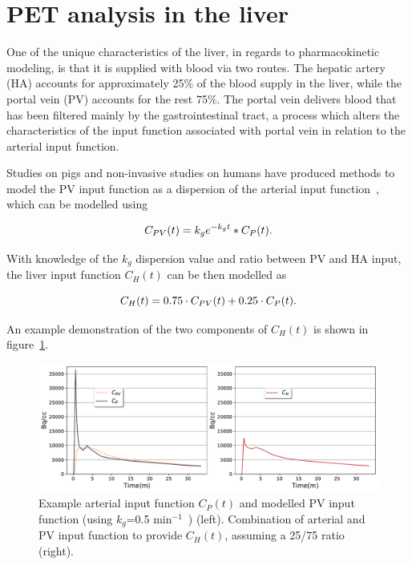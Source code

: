 \section{PET analysis in the liver}
One of the unique characteristics of the liver, in regards to pharmacokinetic modeling, is that it is supplied with blood via two routes. The hepatic artery (HA) accounts for approximately 25\% of the blood supply in the liver, while the portal vein (PV) accounts for the rest 75\%. The portal vein delivers blood that has been filtered mainly by the gastrointestinal tract, a process which alters the characteristics of the input function associated with portal vein in relation to the arterial input function. 

Studies on pigs and non-invasive studies on humans have produced methods to model the PV input function as a dispersion of the arterial input function~\cite{Kudomi2008,Winterdahl2011}, which can be modelled using 

\begin{equation} 
{C_{PV}}(t)  = {k_g} e^{-k_g t} \ast C_P(t)   \\ . \\
\label{eqn:PortalVein}
\end{equation}

With knowledge of the $k_g$ dispersion value and ratio between PV and HA input, the liver input function ${C_{H}}(t)$ can be then modelled as

\begin{equation} 
{C_{H}}(t)  = 0.75 \cdot C_{PV}(t) + 0.25 \cdot C_{P}(t)  \\ . \\
\label{eqn:HepaticInput}
\end{equation}

An example demonstration of the two components of ${C_{H}}(t)$ is shown in figure~\ref{fig_2_2:LiverDualInputFunction}.

\begin{figure} [h!]
\centering
\includegraphics[scale=0.53,angle=0]{2_Theory_Methods/figures/2_2_LiverDualInputFunction.pdf}
\caption{Example arterial input function $C_{P}(t)$ and modelled PV input function (using $k_g$=0.5 min$^{-1}$~\cite{Kudomi2008}) (left). Combination of arterial and PV input function to provide ${C_{H}}(t)$, assuming a 25/75 ratio (right).} 
\label{fig_2_2:LiverDualInputFunction}
\end{figure} 


